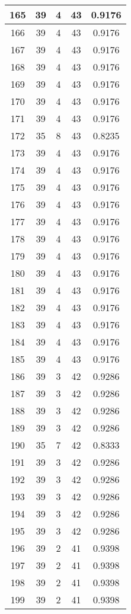 \documentclass[letterpaper, 12pt]{article}
\begin{document}
\begin{longtable}{|c|c|c|c|c|}
\hline
165 & 39 & 4 & 43 & 0.9176 \\
\hline
166 & 39 & 4 & 43 & 0.9176 \\
\hline
167 & 39 & 4 & 43 & 0.9176 \\
\hline
168 & 39 & 4 & 43 & 0.9176 \\
\hline
169 & 39 & 4 & 43 & 0.9176 \\
\hline
170 & 39 & 4 & 43 & 0.9176 \\
\hline
171 & 39 & 4 & 43 & 0.9176 \\
\hline
172 & 35 & 8 & 43 & 0.8235 \\
\hline
173 & 39 & 4 & 43 & 0.9176 \\
\hline
174 & 39 & 4 & 43 & 0.9176 \\
\hline
175 & 39 & 4 & 43 & 0.9176 \\
\hline
176 & 39 & 4 & 43 & 0.9176 \\
\hline
177 & 39 & 4 & 43 & 0.9176 \\
\hline
178 & 39 & 4 & 43 & 0.9176 \\
\hline
179 & 39 & 4 & 43 & 0.9176 \\
\hline
180 & 39 & 4 & 43 & 0.9176 \\
\hline
181 & 39 & 4 & 43 & 0.9176 \\
\hline
182 & 39 & 4 & 43 & 0.9176 \\
\hline
183 & 39 & 4 & 43 & 0.9176 \\
\hline
184 & 39 & 4 & 43 & 0.9176 \\
\hline
185 & 39 & 4 & 43 & 0.9176 \\
\hline
186 & 39 & 3 & 42 & 0.9286 \\
\hline
187 & 39 & 3 & 42 & 0.9286 \\
\hline
188 & 39 & 3 & 42 & 0.9286 \\
\hline
189 & 39 & 3 & 42 & 0.9286 \\
\hline
190 & 35 & 7 & 42 & 0.8333 \\
\hline
191 & 39 & 3 & 42 & 0.9286 \\
\hline
192 & 39 & 3 & 42 & 0.9286 \\
\hline
193 & 39 & 3 & 42 & 0.9286 \\
\hline
194 & 39 & 3 & 42 & 0.9286 \\
\hline
195 & 39 & 3 & 42 & 0.9286 \\
\hline
196 & 39 & 2 & 41 & 0.9398 \\
\hline
197 & 39 & 2 & 41 & 0.9398 \\
\hline
198 & 39 & 2 & 41 & 0.9398 \\
\hline
199 & 39 & 2 & 41 & 0.9398 \\
\hline
\end{longtable}
\end{document}
